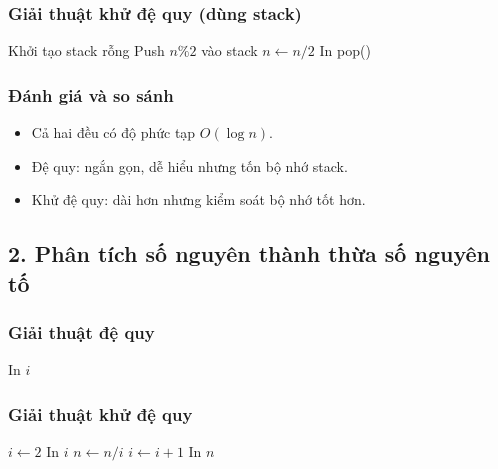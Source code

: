 \documentclass{article}
\begin{document}
\subsubsection*{Giải thuật khử đệ quy (dùng stack)}
\begin{algorithm}[H]
\caption{In nhị phân khử đệ quy}
\begin{algorithmic}
    \STATE Khởi tạo stack rỗng
        \STATE Push $n \% 2$ vào stack
        \STATE $n \leftarrow n / 2$
    \ENDWHILE
        \STATE In pop()
    \ENDWHILE
\ENDPROCEDURE
\end{algorithmic}
\end{algorithm}

\subsubsection*{Đánh giá và so sánh}
\begin{itemize}
    \item Cả hai đều có độ phức tạp $O(\log n)$.
    \item Đệ quy: ngắn gọn, dễ hiểu nhưng tốn bộ nhớ stack.
    \item Khử đệ quy: dài hơn nhưng kiểm soát bộ nhớ tốt hơn.
\end{itemize}

\subsection*{2. Phân tích số nguyên thành thừa số nguyên tố}

\subsubsection*{Giải thuật đệ quy}
\begin{algorithm}[H]
\caption{Phân tích thừa số đệ quy}
\begin{algorithmic}
     \RETURN \ENDIF
            \STATE In $i$
            \STATE {}
            \RETURN
        \ENDIF
    \ENDFOR
\ENDPROCEDURE
\end{algorithmic}
\end{algorithm}

\subsubsection*{Giải thuật khử đệ quy}
\begin{algorithm}[H]
\caption{Phân tích thừa số khử đệ quy}
\begin{algorithmic}
    \STATE $i \leftarrow 2$
            \STATE In $i$
            \STATE $n \leftarrow n / i$
        \ENDWHILE
        \STATE $i \leftarrow i + 1$
    \ENDWHILE
     \STATE In $n$ \ENDIF
\ENDPROCEDURE
\end{algorithmic}
\end{algorithm}
\end{document}
